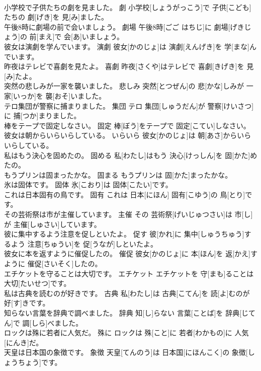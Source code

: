 \documentclass[8pt]{extreport}
\begin{document}
\begin{CJK}{UTF8}{min}
\\	小学校で子供たちの劇を見ました。	劇	小学校[しょうがっこう]で 子供[こども]たちの 劇[げき]を 見[み]ました。	
\\	午後8時に劇場の前で会いましょう。	劇場	午後8時[ごご はちじ]に 劇場[げきじょう]の 前[まえ]で 会[あ]いましょう。	
\\	彼女は演劇を学んでいます。	演劇	彼女[かのじょ]は 演劇[えんげき]を 学[まな]んでいます。	
\\	昨夜はテレビで喜劇を見たよ。	喜劇	昨夜[さくや]はテレビで 喜劇[きげき]を 見[み]たよ。	
\\	突然の悲しみが一家を襲いました。	悲しみ	突然[とつぜん]の 悲[かな]しみが 一家[いっか]を 襲[おそ]いました。	
\\	テロ集団が警察に捕まりました。	集団	テロ 集団[しゅうだん]が 警察[けいさつ]に 捕[つか]まりました。	
\\	棒をテープで固定しなさい。	固定	棒[ぼう]をテープで 固定[こてい]しなさい。	
\\	彼女は朝からいらいらしている。	いらいら	彼女[かのじょ]は 朝[あさ]からいらいらしている。	
\\	私はもう決心を固めたの。	固める	私[わたし]はもう 決心[けっしん]を 固[かた]めたの。	
\\	もうプリンは固まったかな。	固まる	もうプリンは 固[かた]まったかな。	
\\	氷は固体です。	固体	氷[こおり]は 固体[こたい]です。	
\\	これは日本固有の鳥です。	固有	これは 日本[にほん] 固有[こゆう]の 鳥[とり]です。	
\\	その芸術祭は市が主催しています。	主催	その 芸術祭[げいじゅつさい]は 市[し]が 主催[しゅさい]しています。	
\\	彼に集中するよう注意を促しといたよ。	促す	彼[かれ]に 集中[しゅうちゅう]するよう 注意[ちゅうい]を 促[うなが]しといたよ。	
\\	彼女に本を返すように催促したの。	催促	彼女[かのじょ]に 本[ほん]を 返[かえ]すように 催促[さいそく]したの。	
\\	エチケットを守ることは大切です。	エチケット	エチケットを 守[まも]ることは 大切[たいせつ]です。	
\\	私は古典を読むのが好きです。	古典	私[わたし]は 古典[こてん]を 読[よ]むのが 好[す]きです。	
\\	知らない言葉を辞典で調べました。	辞典	知[し]らない 言葉[ことば]を 辞典[じてん]で 調[しら]べました。	
\\	ロックは殊に若者に人気だ。	殊に	ロックは 殊[こと]に 若者[わかもの]に 人気[にんき]だ。	
\\	天皇は日本国の象徴です。	象徴	天皇[てんのう]は 日本国[にほんこく]の 象徴[しょうちょう]です。	

\end{CJK}
\end{document}
